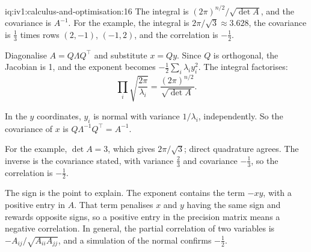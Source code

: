 \begin{solution}{iq:iv1:calculus-and-optimisation:16}
The integral is $(2\pi)^{n/2}/\sqrt{\det A}$, and the covariance is $A^{-1}$. For the example, the integral is $2\pi/\sqrt{3} \approx 3.628$, the covariance is $\frac13$ times rows $(2, -1)$, $(-1, 2)$, and the correlation is $-\frac12$.

Diagonalise $A = Q\Lambda Q^\top$ and substitute $x = Qy$. Since $Q$ is orthogonal, the Jacobian is 1, and the exponent becomes $-\frac12\sum_i\lambda_iy_i^2$. The integral factorises:
\[
\prod_i\sqrt{\frac{2\pi}{\lambda_i}} = \frac{(2\pi)^{n/2}}{\sqrt{\det A}}.
\]

In the $y$ coordinates, $y_i$ is normal with variance $1/\lambda_i$, independently. So the covariance of $x$ is $Q\Lambda^{-1}Q^\top = A^{-1}$.

For the example, $\det A = 3$, which gives $2\pi/\sqrt{3}$; direct quadrature agrees. The inverse is the covariance stated, with variance $\frac23$ and covariance $-\frac13$, so the correlation is $-\frac12$.

The sign is the point to explain. The exponent contains the term $-xy$, with a positive entry in $A$. That term penalises $x$ and $y$ having the same sign and rewards opposite signs, so a positive entry in the precision matrix means a negative correlation. In general, the partial correlation of two variables is $-A_{ij}/\sqrt{A_{ii}A_{jj}}$, and a simulation of the normal confirms $-\frac12$.



\end{solution}

